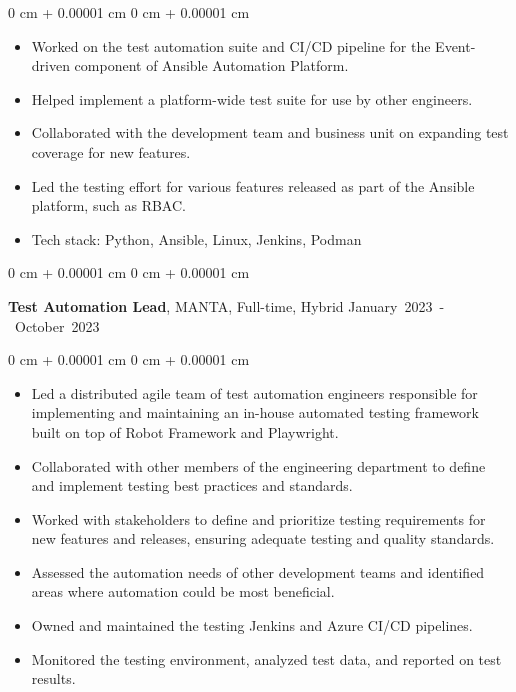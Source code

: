 \documentclass[10pt, a4paper]{article}
\newenvironment{highlights}{
    \begin{itemize}[
        topsep=0.05 cm,
        parsep=0.05 cm,
        partopsep=0pt,
        itemsep=0pt,
        leftmargin=0 cm + 10pt
    ]
}{
    \end{itemize}
} %
\newenvironment{onecolentry}{
    \begin{adjustwidth}{
        0 cm + 0.00001 cm
    }{
        0 cm + 0.00001 cm
    }
}{
    \end{adjustwidth}
} %
\newenvironment{twocolentry}[2][]{
    \onecolentry
    \def\secondColumn{#2}
    \setcolumnwidth{\fill, 4.5 cm}
    \begin{paracol}{2}
}{
    \switchcolumn \raggedleft \secondColumn
    \end{paracol}
    \endonecolentry
} %
\begin{document}
        \begin{onecolentry}
            \begin{highlights}
                \item Worked on the test automation suite and CI/CD pipeline for the Event-driven component of Ansible Automation Platform.
                \item Helped implement a platform-wide test suite for use by other engineers.
                \item Collaborated with the development team and business unit on expanding test coverage for new features.
                \item Led the testing effort for various features released as part of the Ansible platform, such as RBAC.
                \item Tech stack: Python, Ansible, Linux, Jenkins, Podman
            \end{highlights}
        \end{onecolentry}

        \vspace{0.5 cm}

        \begin{twocolentry}{
            \small\mbox{January 2023 - October 2023}
        }
            \textbf{Test Automation Lead}, MANTA, Full-time, Hybrid\end{twocolentry}

        \vspace{0.10 cm}
        \begin{onecolentry}
            \begin{highlights}
                \item Led a distributed agile team of test automation engineers responsible for implementing and maintaining an in-house automated testing framework built on top of Robot Framework and Playwright.
                \item Collaborated with other members of the engineering department to define and implement testing best practices and standards.
                \item Worked with stakeholders to define and prioritize testing requirements for new features and releases, ensuring adequate testing and quality standards.
                \item Assessed the automation needs of other development teams and identified areas where automation could be most beneficial.
                \item Owned and maintained the testing Jenkins and Azure CI/CD pipelines.
                \item Monitored the testing environment, analyzed test data, and reported on test results.
            \end{highlights}
        \end{onecolentry}
\end{document}
